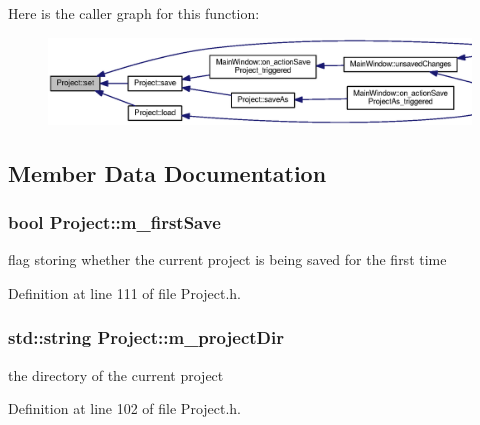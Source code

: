 Here is the caller graph for this function\-:\nopagebreak
\begin{figure}[H]
\begin{center}
\leavevmode
\includegraphics[width=350pt]{class_project_ace11706afa0348c2e6cb0151285167e9_icgraph}
\end{center}
\end{figure}




\subsection{Member Data Documentation}
\subsubsection[{m\-\_\-first\-Save}]{\setlength{\rightskip}{0pt plus 5cm}bool Project\-::m\-\_\-first\-Save\hspace{0.3cm}{\ttfamily [private]}}\label{class_project_a29e0d478a805788272a0a8ef989db922}


flag storing whether the current project is being saved for the first time 



Definition at line 111 of file Project.\-h.

\subsubsection[{m\-\_\-project\-Dir}]{\setlength{\rightskip}{0pt plus 5cm}std\-::string Project\-::m\-\_\-project\-Dir\hspace{0.3cm}{\ttfamily [private]}}\label{class_project_afb87863a3abb8ecf0e39371f41b34588}


the directory of the current project 



Definition at line 102 of file Project.\-h.

